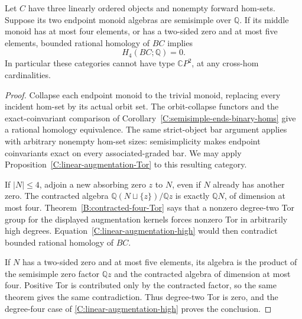 \begin{corollary}\label{C:semisimple-ends-middle-four}
Let $C$ have three linearly ordered objects and nonempty
forward hom-sets.  Suppose its two endpoint monoid
algebras are semisimple over $\mathbb Q$.  If its middle
monoid has at most four elements, or has a two-sided zero
and at most five elements, bounded rational homology of
$BC$ implies
\[
 H_4(BC;\mathbb Q)=0.
\]
In particular these categories cannot have type
$\mathbb CP^2$, at any cross-hom cardinalities.
\end{corollary}
\begin{proof}
Collapse each endpoint monoid to the trivial monoid,
replacing every incident hom-set by its actual orbit set.
The orbit-collapse functors and the exact-coinvariant
comparison of
Corollary~\ref{C:semisimple-ends-binary-homs}
give a rational homology equivalence.  The same
strict-object bar argument applies with arbitrary
nonempty hom-set sizes: semisimplicity makes endpoint
coinvariants exact on every associated-graded bar.
We may apply Proposition~\ref{C:linear-augmentation-Tor}
to this resulting category.

If $|N|\leq4$, adjoin a new absorbing zero $z$ to $N$,
even if $N$ already has another zero.  The contracted
algebra $\mathbb Q(N\sqcup\{z\})/\mathbb Qz$ is
exactly $\mathbb QN$, of dimension at most four.
Theorem~\ref{B:contracted-four-Tor} says that a nonzero
degree-two Tor group for the displayed augmentation
kernels forces nonzero Tor in arbitrarily high degrees.
Equation~\eqref{C:linear-augmentation-high} would then
contradict bounded rational homology of $BC$.

If $N$ has a two-sided zero and at most five elements,
its algebra is the product of the semisimple zero factor
$\mathbb Qz$ and the contracted algebra of dimension at
most four.  Positive Tor is contributed only by the
contracted factor, so the same theorem gives the same
contradiction.  Thus degree-two Tor is zero, and the
degree-four case of
\eqref{C:linear-augmentation-high} proves the conclusion.
\end{proof}

